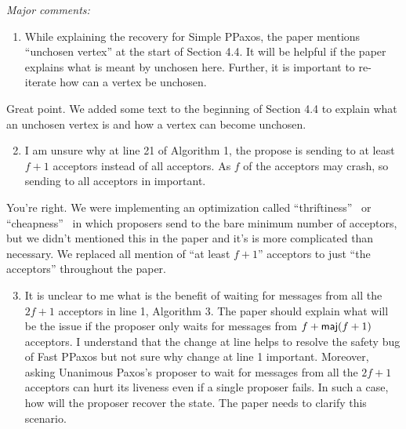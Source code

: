 \documentclass[letterpaper,twocolumn,10pt]{article}
\newenvironment{reviewerquote}
{\list{}{\leftmargin=\parindent\rightmargin=0in}\item[] \itshape \color{ReviewerDarkGray}}%
{\endlist}
\begin{document}
\begin{reviewerquote}
  Major comments:

  \begin{enumerate}
    \setcounter{enumi}{0}
    \item
      While explaining the recovery for Simple PPaxos, the paper mentions
      ``unchosen vertex'' at the start of Section 4.4. It will be helpful if
      the paper explains what is meant by unchosen here. Further, it is
      important to re-iterate how can a vertex be unchosen.
  \end{enumerate}
\end{reviewerquote}

Great point. We added some text to the beginning of Section 4.4 to explain what
an unchosen vertex is and how a vertex can become unchosen.

\begin{reviewerquote}
  \begin{enumerate}
    \setcounter{enumi}{1}
    \item
      I am unsure why at line 21 of Algorithm 1, the propose is sending to at
      least $f+1$ acceptors instead of all acceptors. As $f$ of the acceptors
      may crash, so sending to all acceptors in important.
  \end{enumerate}
\end{reviewerquote}

You're right. We were implementing an optimization called
``thriftiness''~\cite{moraru2013there} or ``cheapness''~\cite{lamport2004cheap}
in which proposers send to the bare minimum number of acceptors, but we didn't
mentioned this in the paper and it's is more complicated than necessary. We
replaced all mention of ``at least $f+1$'' acceptors to just ``the acceptors''
throughout the paper.

\begin{reviewerquote}
  \begin{enumerate}
    \setcounter{enumi}{2}
    \item
      It is unclear to me what is the benefit of waiting for messages from all
      the $2f+1$ acceptors in line 1, Algorithm 3. The paper should explain what
      will be the issue if the proposer only waits for messages from $f +
      \textsf{maj}(f+1)$ acceptors. I understand that the change at line helps to resolve
      the safety bug of Fast PPaxos but not sure why change at line 1
      important. Moreover, asking Unanimous Paxos's proposer to wait for
      messages from all the $2f+1$ acceptors can hurt its liveness even if a
      single proposer fails. In such a case, how will the proposer recover the
      state. The paper needs to clarify this scenario.
  \end{enumerate}
\end{reviewerquote}
\end{document}
